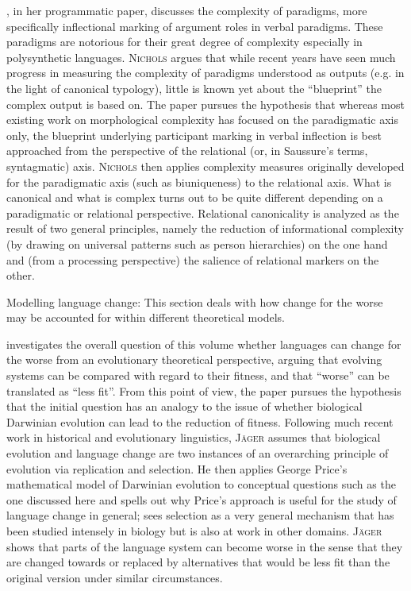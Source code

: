 \documentclass[output=paper,hidelinks]{langscibook}
\begin{document}
\textsc{}, in her programmatic paper, discusses the complexity of paradigms, more specifically inflectional marking of argument roles in verbal paradigms. These paradigms are notorious for their great degree of complexity especially in polysynthetic languages. \textsc{Nichols} argues that while recent years have seen much progress in measuring the complexity of paradigms understood as outputs (e.g. in the light of canonical typology), little is known yet about the ``blueprint'' the complex output is based on. The paper pursues the hypothesis that whereas most existing work on morphological complexity has focused on the paradigmatic axis only, the blueprint underlying participant marking in verbal inflection is best approached from the perspective of the relational (or, in Saussure's terms, syntagmatic) axis. \textsc{Nichols} then applies complexity measures originally developed for the paradigmatic axis (such as biuniqueness) to the relational axis. What is canonical and what is complex turns out to be quite different depending on a paradigmatic or relational perspective. Relational canonicality is analyzed as the result of two general principles, namely the reduction of informational complexity (by drawing on universal patterns such as person hierarchies) on the one hand and (from a processing perspective) the salience of relational markers on the other.

Modelling language change: This section deals with how change for the worse may be accounted for within different theoretical models.

\textsc{} investigates the overall question of this volume whether languages can change for the worse from an evolutionary theoretical perspective, arguing that evolving systems can be compared with regard to their fitness, and that “worse” can be translated as “less fit”. From this point of view, the paper pursues the hypothesis that the initial question has an analogy to the issue of whether biological Darwinian evolution can lead to the reduction of fitness. Following much recent work in historical and evolutionary linguistics, \textsc{Jäger} assumes that biological evolution and language change are two instances of an overarching principle of evolution via replication and selection. He then applies George Price’s mathematical model of Darwinian evolution to conceptual questions such as the one discussed here and spells out why Price’s approach is useful for the study of language change in general; \citet{Price_1995} sees selection as a very general mechanism that has been studied intensely in biology but is also at work in other domains. \textsc{Jäger} shows that parts of the language system can become worse in the sense that they are changed towards or replaced by alternatives that would be less fit than the original version under similar circumstances.
\end{document}
